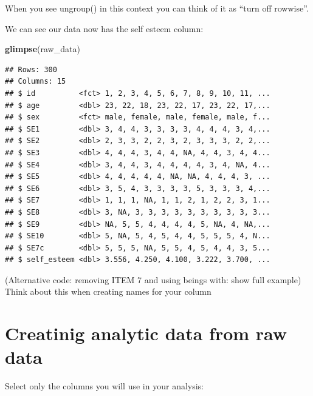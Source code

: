 \documentclass[
]{krantz}
\makeatletter
\newenvironment{Shaded}{\begin{snugshade}}{\end{snugshade}}
\newcommand{\KeywordTok}[1]{\textcolor[rgb]{0.27,0.27,0.27}{\textbf{#1}}}
\newcommand{\NormalTok}[1]{#1}
\newcommand{\OperatorTok}[1]{\textcolor[rgb]{0.43,0.43,0.43}{\textbf{#1}}}
\newcommand{\StringTok}[1]{\textcolor[rgb]{0.5,0.5,0.5}{#1}}
\newenvironment{kframe}{%
\medskip{}
\setlength{\fboxsep}{.8em}
 \def\at@end@of@kframe{}%
 \ifinner\ifhmode%
  \def\at@end@of@kframe{\end{minipage}}%
  \begin{minipage}{\columnwidth}%
 \fi\fi%
 \def\FrameCommand##1{\hskip\@totalleftmargin \hskip-\fboxsep
 \colorbox{shadecolor}{##1}\hskip-\fboxsep
     \hskip-\linewidth \hskip-\@totalleftmargin \hskip\columnwidth}%
 \MakeFramed {\advance\hsize-\width
   \@totalleftmargin\z@ \linewidth\hsize
   \@setminipage}}%
 {\par\unskip\endMakeFramed%
 \at@end@of@kframe}
\renewenvironment{Shaded}{\begin{kframe}}{\end{kframe}}
\makeatother
\begin{document}
When you see ungroup() in this context you can think of it as ``turn off rowwise''.

We can see our data now has the self esteem column:

\begin{Shaded}
\begin{Highlighting}[]
\KeywordTok{glimpse}\NormalTok{(raw_data)}
\end{Highlighting}
\end{Shaded}

\begin{verbatim}
## Rows: 300
## Columns: 15
## $ id          <fct> 1, 2, 3, 4, 5, 6, 7, 8, 9, 10, 11, ...
## $ age         <dbl> 23, 22, 18, 23, 22, 17, 23, 22, 17,...
## $ sex         <fct> male, female, male, female, male, f...
## $ SE1         <dbl> 3, 4, 4, 3, 3, 3, 3, 4, 4, 4, 3, 4,...
## $ SE2         <dbl> 2, 3, 3, 2, 2, 3, 2, 3, 3, 3, 2, 2,...
## $ SE3         <dbl> 4, 4, 4, 3, 4, 4, NA, 4, 4, 3, 4, 4...
## $ SE4         <dbl> 3, 4, 4, 3, 4, 4, 4, 4, 3, 4, NA, 4...
## $ SE5         <dbl> 4, 4, 4, 4, 4, NA, NA, 4, 4, 4, 3, ...
## $ SE6         <dbl> 3, 5, 4, 3, 3, 3, 3, 5, 3, 3, 3, 4,...
## $ SE7         <dbl> 1, 1, 1, NA, 1, 1, 2, 1, 2, 2, 3, 1...
## $ SE8         <dbl> 3, NA, 3, 3, 3, 3, 3, 3, 3, 3, 3, 3...
## $ SE9         <dbl> NA, 5, 5, 4, 4, 4, 4, 5, NA, 4, NA,...
## $ SE10        <dbl> 5, NA, 5, 4, 5, 4, 4, 5, 5, 5, 4, N...
## $ SE7c        <dbl> 5, 5, 5, NA, 5, 5, 4, 5, 4, 4, 3, 5...
## $ self_esteem <dbl> 3.556, 4.250, 4.100, 3.222, 3.700, ...
\end{verbatim}

(Alternative code: removing ITEM 7 and using beings with: show full example)
Think about this when creating names for your column

\hypertarget{creatinig-analytic-data-from-raw-data}{%
\section{Creatinig analytic data from raw data}\label{creatinig-analytic-data-from-raw-data}}

Select only the columns you will use in your analysis:

\begin{Shaded}
\end{Shaded}
\end{document}

